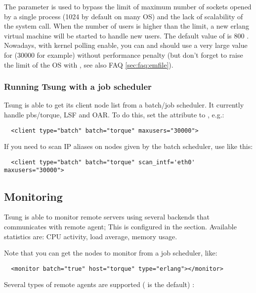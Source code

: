 \documentclass{TSUNG-en}
\begin{document}
 The  parameter is used to bypass the limit of
 maximum number of sockets opened by a single process (1024 by
 default on many OS)
 and the lack of scalability of the  system call. When
 the number of users is higher than the limit, a new erlang virtual
 machine will be started to handle new users. The default value of
  is 800 . Nowadays, with kernel polling enable, you
 can and should use a very large value for  (30000 for example) without
 performance penalty (but don't forget to raise the limit of the OS with
 , see also FAQ \ref{sec:faq:emfile}).

\subsubsection{Running Tsung with a job scheduler}

Tsung is able to get its client node list from a batch/job
scheduler. It currently handle pbs/torque, LSF and OAR. To do this,
 set the  attribute to , e.g.:

\begin{Verbatim}
  <client type="batch" batch="torque" maxusers="30000">
\end{Verbatim}

If you need to scan IP aliases on nodes given by the batch scheduler,
use  like this:
\begin{Verbatim}
  <client type="batch" batch="torque" scan_intf='eth0'  maxusers="30000">
\end{Verbatim}

\subsection{Monitoring}

Tsung is able to monitor remote servers using several backends that
communicates with remote agent; This
is configured in the  section. Available
statistics are: CPU activity, load average, memory usage.

Note that you can get the nodes to monitor from a job scheduler, like:
\begin{Verbatim}
  <monitor batch="true" host="torque" type="erlang"></monitor>
\end{Verbatim}


Several types of remote agents are supported ( is the default) :
\end{document}
